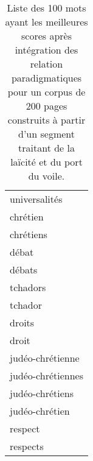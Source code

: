 \begin{table}[h]
\begin{center}
\begin{tabular}{|l|}
universalités\\
chrétien\\
chrétiens\\
débat\\
débats\\
tchadors\\
tchador\\
droits\\
droit\\
judéo-chrétienne\\
judéo-chrétiennes\\
judéo-chrétiens\\
judéo-chrétien\\
respect\\
respects\\
\hline
	\end{tabular}
	\end{center}
\vspace{-0.2cm}
\caption{Liste des 100 mots ayant les meilleures scores après intégration
des relation paradigmatiques pour un corpus de 200
pages construits à partir d'un segment traitant de la laïcité et du port du
voile.}
\label{tab:liste_termes_simples_parad}
\end{table}

